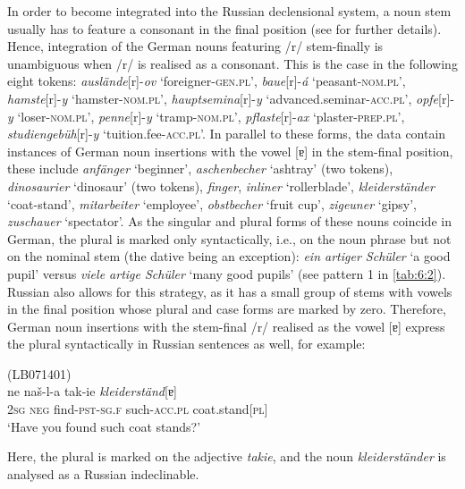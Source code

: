\begin{sloppypar}
In order to become integrated into the Russian declensional system, a noun stem usually has to feature a consonant in the final position (see  for further details). Hence, integration of the German nouns featuring /r/ stem-finally is unambiguous when /r/ is realised as a consonant. This is the case in the following eight tokens: \textit{auslände}[r]-\textit{ov} `foreigner-\textsc{gen.pl}', \textit{baue}[r]-\textit{á} `peasant-\textsc{nom.pl}', \textit{hamste}[r]-\textit{y} `hamster-\textsc{nom.pl}', \textit{hauptsemina}[r]-\textit{y}  ‘advanced.seminar-\textsc{acc}.\textsc{pl}’, \textit{opfe}[r]-\textit{y} `loser-\textsc{nom.pl}', \textit{penne}[r]-\textit{y} `tramp-\textsc{nom.pl}', \textit{pflaste}[r]-\textit{ax} `plaster-\textsc{prep.pl}', \textit{studiengebüh}[r]-\textit{y} `tuition.fee-\textsc{acc.pl}'. In parallel to these forms, the data contain instances of German noun insertions with the vowel [ɐ] in the stem-final position, these include \textit{anfänger} `beginner', \textit{aschenbecher} `ashtray' (two tokens), \textit{dinosaurier} `dinosaur' (two tokens), \textit{finger}, \textit{inliner} `rollerblade',  \textit{kleiderständer} `coat-stand', \textit{mitarbeiter} `employee', \textit{obstbecher} `fruit cup', \textit{zigeuner} `gipsy', \textit{zuschauer} `spectator'. As the singular and plural forms of these nouns coincide in German, the plural is marked only syntactically, i.e., on the noun phrase but not on the nominal stem (the dative being an exception): \textit{ein artiger Schüler} `a good pupil' versus \textit{viele artige Schüler} `many good pupils' (see pattern 1 in \ref{tab:6:2}). Russian also allows for this strategy, as it has a small group of stems with vowels in the final position whose plural and case forms are marked by zero. Therefore, German noun insertions with the stem-final /r/ realised as the vowel [ɐ] express the plural syntactically in Russian sentences as well, for example:
\end{sloppypar}

\ea
\label{ex:6:16}
(LB071401)\\
 {ne} {naš-l-a} {tak-ie} \textit{kleiderständ}[ɐ]\\
	\textsc{2sg} \textsc{neg} find-\textsc{pst-sg.f} such-\textsc{acc.pl} coat.stand[\textsc{pl}]\\
\glt `Have you found such coat stands?'
\z

\noindent Here, the plural is marked on the adjective \textit{takie}, and the noun \textit{kleiderständer} is analysed as a Russian indeclinable. 

